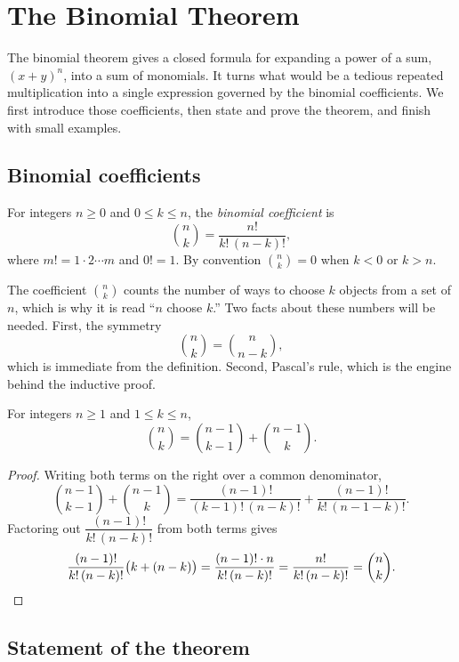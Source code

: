 \section{The Binomial Theorem}

The binomial theorem gives a closed formula for expanding a power of a sum, $(x + y)^n$, into a sum of monomials. It turns what would be a tedious repeated multiplication into a single expression governed by the binomial coefficients. We first introduce those coefficients, then state and prove the theorem, and finish with small examples.

\subsection{Binomial coefficients}

\begin{definition}
For integers $n \geq 0$ and $0 \leq k \leq n$, the \emph{binomial coefficient} is
\[
\binom{n}{k} = \frac{n!}{k!\,(n-k)!},
\]
where $m! = 1 \cdot 2 \cdots m$ and $0! = 1$. By convention $\binom{n}{k} = 0$ when $k < 0$ or $k > n$.
\end{definition}

The coefficient $\binom{n}{k}$ counts the number of ways to choose $k$ objects from a set of $n$, which is why it is read ``$n$ choose $k$.'' Two facts about these numbers will be needed. First, the symmetry
\[
\binom{n}{k} = \binom{n}{n-k},
\]
which is immediate from the definition. Second, Pascal's rule, which is the engine behind the inductive proof.

\begin{lemma}\label{lem:pascal}
For integers $n \geq 1$ and $1 \leq k \leq n$,
\[
\binom{n}{k} = \binom{n-1}{k-1} + \binom{n-1}{k}.
\]
\end{lemma}

\begin{proof}
Writing both terms on the right over a common denominator,
\[
\binom{n-1}{k-1} + \binom{n-1}{k}
= \frac{(n-1)!}{(k-1)!\,(n-k)!} + \frac{(n-1)!}{k!\,(n-1-k)!}.
\]
Factoring out $\dfrac{(n-1)!}{k!\,(n-k)!}$ from both terms gives
\[
\frac{(n-1)!}{k!\,(n-k)!}\bigl(k + (n-k)\bigr) = \frac{(n-1)!\cdot n}{k!\,(n-k)!} = \frac{n!}{k!\,(n-k)!} = \binom{n}{k}. \qedhere
\]
\end{proof}

\subsection{Statement of the theorem}

